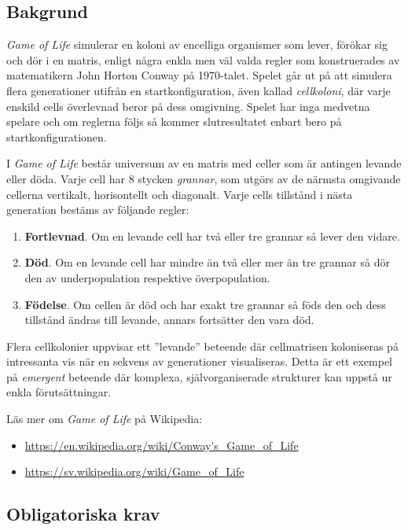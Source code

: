 \subsection{Bakgrund}

\emph{Game of Life} simulerar en koloni av encelliga organismer som lever, förökar sig och dör i en matris, enligt några enkla men väl valda regler som konstruerades av matematikern John Horton Conway på 1970-talet. Spelet går ut på att simulera flera generationer utifrån en startkonfiguration, även kallad \emph{cellkoloni}, där varje enskild cells överlevnad beror på dess omgivning. Spelet har inga medvetna spelare och om reglerna följs så kommer slutresultatet enbart bero på startkonfigurationen.

I \emph{Game of Life} består universum av en matris med celler som är antingen levande eller döda. Varje cell har 8 stycken \emph{grannar}, som utgörs av de närmsta omgivande cellerna vertikalt, horisontellt och diagonalt. Varje cells tillstånd i nästa generation bestäms av följande regler:
\begin{enumerate}[nolistsep]
    \item \textbf{Fortlevnad}. Om en levande cell har två eller tre grannar så lever den vidare.
    \item \textbf{Död}. Om en levande cell har mindre än två eller mer än tre grannar så dör den av underpopulation respektive överpopulation.
    \item \textbf{Födelse}. Om cellen är död och har exakt tre grannar så föds den och dess tillstånd ändras till levande, annars fortsätter den vara död.
\end{enumerate}

Flera cellkolonier uppvisar ett ''levande'' beteende där cellmatrisen koloniseras på intressanta vis när en sekvens av generationer visualiseras. Detta är ett exempel på \emph{emergent} beteende där komplexa, självorganiserade strukturer kan uppstå ur enkla förutsättningar.

Läs mer om \emph{Game of Life} på Wikipedia:
\begin{itemize}[noitemsep,topsep=0pt]
    	\item \url{https://en.wikipedia.org/wiki/Conway's_Game_of_Life}
    	\item \url{https://sv.wikipedia.org/wiki/Game_of_Life}
\end{itemize}


\subsection{Obligatoriska krav}

